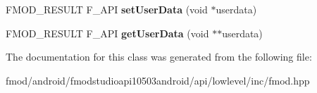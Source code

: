 \begin{DoxyCompactItemize}
\item 
\hypertarget{class_f_m_o_d_1_1_system_ab2f36a02a4badbc4fc4727f37f62b7c3}{F\+M\+O\+D\+\_\+\+R\+E\+S\+U\+L\+T F\+\_\+\+A\+P\+I {\bfseries set\+User\+Data} (void $\ast$userdata)}\label{class_f_m_o_d_1_1_system_ab2f36a02a4badbc4fc4727f37f62b7c3}

\item 
\hypertarget{class_f_m_o_d_1_1_system_a04c439bfbbfa385ce819b29b26584fc5}{F\+M\+O\+D\+\_\+\+R\+E\+S\+U\+L\+T F\+\_\+\+A\+P\+I {\bfseries get\+User\+Data} (void $\ast$$\ast$userdata)}\label{class_f_m_o_d_1_1_system_a04c439bfbbfa385ce819b29b26584fc5}

\end{DoxyCompactItemize}


The documentation for this class was generated from the following file\+:\begin{DoxyCompactItemize}
\item 
fmod/android/fmodstudioapi10503android/api/lowlevel/inc/fmod.\+hpp\end{DoxyCompactItemize}
